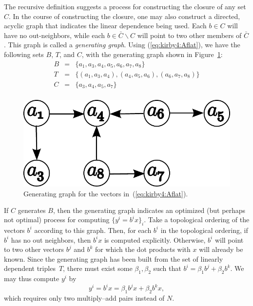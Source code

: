 The recursive definition suggests a process for constructing the
closure of any set \( C \).  In the course of constructing the
closure, one may also construct a directed, acyclic graph that
indicates the linear dependence being used.  Each \( b \in C \) will
have no out-neighbors, while each \( b \in \bar{C} \backslash C \)
will point to two other members of \( \bar{C} \).  This graph is
called a \emph{generating graph}. Using (\ref{eq:kirby4:Aflat}), we
have the following sets $B$, $T$, and $C$, with the generating graph
shown in Figure~\ref{fig:kirby4:gg}:
\begin{displaymath}
\begin{array}{rcl}
 B & = &  \{a_1, a_3, a_4, a_5, a_6, a_7, a_8\} \\
 T & = & \{(a_1, a_3, a_4),(a_4, a_5, a_6), (a_6, a_7, a_8)\} \\
 C & = & \{a_3, a_4, a_5, a_7\} \\
\end{array}
\end{displaymath}

\begin{figure}
  \begin{center}
 \includegraphics[width=\smallfig]{chapters/kirby-4/pdf/gg2.pdf}
  \caption{Generating graph for the vectors in~(\ref{eq:kirby4:Aflat}).}
  \label{fig:kirby4:gg}
  \end{center}
\end{figure}

If $C$ generates \( B \), then the generating graph indicates an
optimized (but perhaps not optimal) process for computing \( \{ y^i =
b^i x \}_i\).  Take a topological ordering of the vectors \( b^i \)
according to this graph.  Then, for each \( b^i \) in the topological
ordering, if \( b^i \) has no out neighbors, then \( b^i x \) is
computed explicitly.  Otherwise, \( b^i \) will point to two other
vectors \( b^j \) and \( b^k \) for which the dot products with \( x
\) will already be known. Since the generating graph has been built
from the set of linearly dependent triples~$T$, there must exist some
\( \beta_1, \beta_2 \) such that \( b^i = \beta_1 b^j + \beta_2 b^k
\). We may thus compute $y^i$ by
\[
y^i = b^i x = \beta_1 b^j x
+ \beta_2  b^k  x,
\]
which requires only two multiply--add pairs instead of \( N \).

